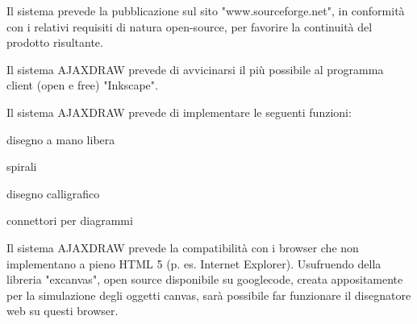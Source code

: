 \begin{elenconumerato}{\subsecindent}
\item Il sistema prevede la pubblicazione sul sito "www.sourceforge.net", in conformit\`a con i relativi requisiti di natura open-source, per favorire la continuit\`a del prodotto risultante.
\end{elenconumerato}

\begin{elenconumerato}{\subsecindent}
\item Il sistema AJAXDRAW prevede di avvicinarsi il pi\`u possibile al programma client (open e free) "Inkscape". 
\item Il sistema AJAXDRAW prevede di implementare le seguenti funzioni:

\begin{list}{-}{}
\item disegno a mano libera
\item spirali
\item disegno calligrafico
\item connettori per diagrammi
\end{list}

\item Il sistema AJAXDRAW prevede la compatibilit\`a con i browser che non implementano a pieno HTML 5 (p. es. Internet Explorer). Usufruendo della libreria "excanvas", open source disponibile su googlecode, creata appositamente per la simulazione degli oggetti canvas, sar\`a possibile far funzionare il disegnatore web su questi browser. 
\end{elenconumerato}


